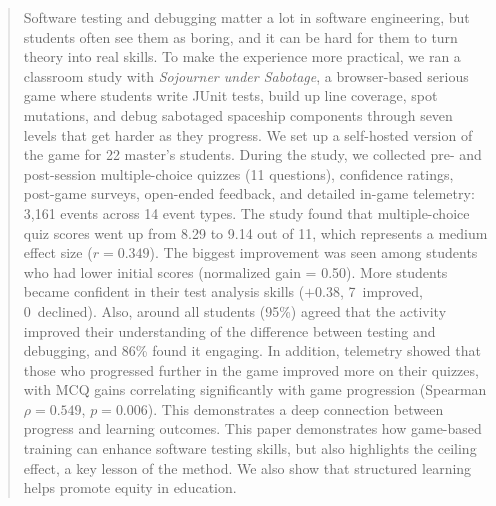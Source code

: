 \documentclass[conference]{IEEEtran}
\begin{document}
\begin{abstract}
Software testing and debugging matter a lot in software engineering, but students often see them as boring, and it can be hard for them to turn theory into real skills. To make the experience more practical, we ran a classroom study with \emph{Sojourner under Sabotage}, a browser-based serious game where students write JUnit tests, build up line coverage, spot mutations, and debug sabotaged spaceship components through seven levels that get harder as they progress. We set up a self-hosted version of the game for 22 master's students. During the study, we collected pre- and post-session multiple-choice quizzes (11 questions), confidence ratings, post-game surveys, open-ended feedback, and detailed in-game telemetry: 3,161 events across 14 event types. The study found that multiple-choice quiz scores went up from 8.29 to 9.14 out of 11, which represents a medium effect size ($r = 0.349$). The biggest improvement was seen among students who had lower initial scores (normalized gain = 0.50). More students became confident in their test analysis skills ($+0.38$, 7~improved, 0~declined). Also, around all students (95\%) agreed that the activity improved their understanding of the difference between testing and debugging, and 86\% found it engaging. In addition, telemetry showed that those who progressed further in the game improved more on their quizzes, with MCQ gains correlating significantly with game progression (Spearman $\rho = 0.549$, $p = 0.006$). This demonstrates a deep connection between progress and learning outcomes. This paper demonstrates how game-based training can enhance software testing skills, but also highlights the ceiling effect, a key lesson of the method. We also show that structured learning helps promote equity in education.


\end{abstract}
\end{document}
